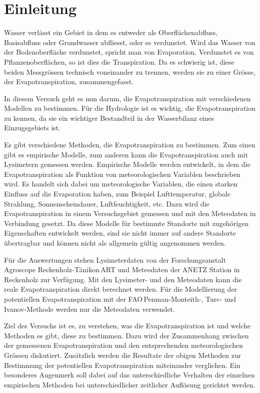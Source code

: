 \section{Einleitung}
Wasser verlässt ein Gebiet in dem es entweder als Oberflächenabfluss, Basisabfluss oder Grundwasser abfliesst, oder es verdunstet. Wird das Wasser von der Bodenoberfläche verdunstet, spricht man von Evaporation. Verdunstet es von Pflanzenoberflächen, so ist dies die Transpiration. Da es schwierig ist, diese beiden Messgrössen technisch voneinander zu trennen, werden sie zu einer Grösse, der Evapotranspiration, zusammengefasst.

In diesem Versuch geht es nun darum, die Evapotranspiration mit verschiedenen Modellen zu bestimmen. Für die Hydrologie ist es wichtig, die Evapotranspiration zu kennen, da sie ein wichtiger Bestandteil in der Wasserbilanz eines Einzugsgebiets ist.

Es gibt verschiedene Methoden, die Evapotranspiration zu bestimmen. Zum einen gibt es empirische Modelle, zum anderen kann die Evapotranspiration auch mit Lysimetern gemessen werden. Empirische Modelle werden entwickelt, in dem die Evapotranspiration als Funktion von meteorologischen Variablen beschrieben wird. Es handelt sich dabei um meteorologische Variablen, die einen starken Einfluss auf die Evaporation haben, zum Beispiel Lufttemperatur, globale Strahlung, Sonnenscheindauer, Luftfeuchtigkeit, etc. Dazu wird die Evapotranspiration in einem Versuchsgebiet gemessen und mit den Meteodaten in Verbindung gesetzt. Da diese Modelle für bestimmte Standorte mit zugehörigen Eigenschaften entwickelt werden, sind sie nicht immer auf andere Standorte übertragbar und können nicht als allgemein gültig angenommen werden.

Für die Auswertungen stehen Lysimeterdaten von der Forschungsanstalt Agroscope Reckenholz-Tänikon\,ART und Meteodaten der ANETZ Station in Reckenholz zur Verfügung. Mit den Lysimeter- und den Meteodaten kann die reale Evapotranspiration direkt berechnet werden. Für die Modellierung der potentiellen Evapotranspiration mit der FAO\,Penman-Monteith-, Turc- und Ivanov-Methode werden nur die Meteodaten verwendet.

Ziel des Versuchs ist es, zu verstehen, was die Evapotranspiration ist und welche Methoden es gibt, diese zu bestimmen. Dazu wird der Zusammenhang zwischen der gemessenen Evapotranspiration und den entsprechenden meteorologischen Grössen diskutiert. Zusätzlich werden die Resultate der obigen Methoden zur Bestimmung der potentiellen Evapotranspiration miteinander verglichen. Ein besonderes Augenmerk soll dabei auf das unterschiedliche Verhalten der einzelnen empirischen Methoden bei unterschiedlicher zeitlicher Auflösung gerichtet werden.